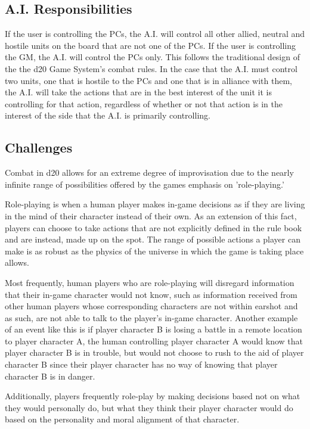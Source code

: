 \documentclass[12pt,a4paper]{report}
\begin{document}
		\subsection{A.I. Responsibilities}
		If the user is controlling the PCs, the A.I. will control all other allied, neutral and hostile units on the board that are not one of the PCs. If the user is controlling the GM, the A.I. will control the PCs only. This follows the traditional design of the the d20 Game System's combat rules. In the case that the A.I. must control two units, one that is hostile to the PCs and one that is in alliance with them, the A.I. will take the actions that are in the best interest of the unit it is controlling for that action, regardless of whether or not that action is in the interest of the side that the A.I. is primarily controlling.
		
		\subsection{Challenges}
		Combat in d20 allows for an extreme degree of improvisation due to the nearly infinite range of possibilities offered by the games emphasis on 'role-playing.' 
		
		Role-playing is when a human player makes in-game decisions as if they are living in the mind of their character instead of their own. As an extension of this fact, players can choose to take actions that are not explicitly defined in the rule book and are instead, made up on the spot. The range of possible actions a player can make is as robust as the physics of the universe in which the game is taking place allows. 
		
		Most frequently, human players who are role-playing will disregard information that their in-game character would not know, such as information received from other human players whose corresponding characters are not within earshot and as such, are not able to talk to the player's in-game character. Another example of an event like this is if player character B is losing a battle in a remote location to player character A, the human controlling player character A would know that player character B is in trouble, but would not choose to rush to the aid of player character B since their player character has no way of knowing that player character B is in danger. 
		
		Additionally, players frequently role-play by making decisions based not on what they would personally do, but what they think their player character would do based on the personality and moral alignment of that character.
		
\end{document}

